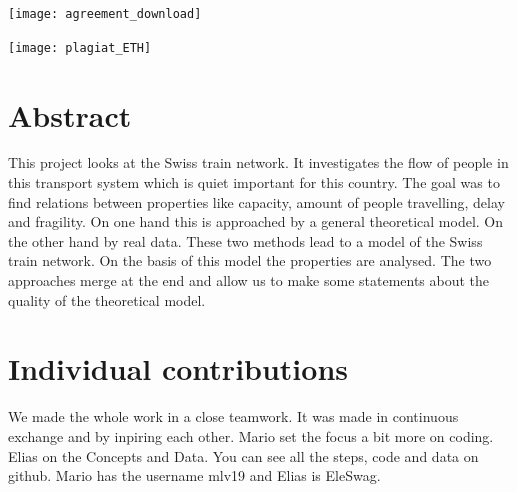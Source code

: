 \documentclass[11pt]{article}
\begin{document}

\newpage


\newpage

\texttt{[image: agreement\_download]}

\newpage





\newpage

\texttt{[image: plagiat\_ETH]}

\newpage



\tableofcontents

\newpage




\section{Abstract}

This project looks at the Swiss train network. It investigates the flow of people in this transport system which is quiet important for this country. The goal was to find relations between properties like capacity, amount of people travelling, delay and fragility. On one hand this is approached  by a general theoretical model. On the other hand by real data. These two methods lead to a model of the Swiss train  network. On the basis of this model the properties are analysed. The two approaches merge at the end and allow us to make some statements about the quality of the theoretical model.
 

\section{Individual contributions}

We made the whole work in a close teamwork. It was made in continuous exchange and by inpiring each other. Mario set the focus a bit more on coding. Elias on the Concepts and Data. You can see all the steps, code and data on github. Mario has the username mlv19 and Elias is EleSwag.\newline
\end{document}
